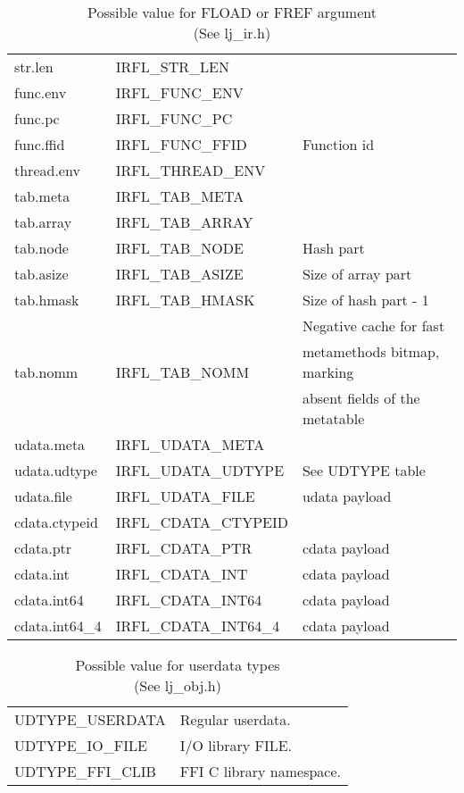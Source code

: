 \begin{table}
\centering
\begin{tabular}{|l|l|l|}
\hline
str.len        & IRFL\_STR\_LEN        & \\
func.env       & IRFL\_FUNC\_ENV       & \\
func.pc        & IRFL\_FUNC\_PC        & \\
func.ffid      & IRFL\_FUNC\_FFID      & Function id\\
thread.env     & IRFL\_THREAD\_ENV     & \\
tab.meta       & IRFL\_TAB\_META       & \\
tab.array      & IRFL\_TAB\_ARRAY      & \\
tab.node       & IRFL\_TAB\_NODE       & Hash part\\
tab.asize      & IRFL\_TAB\_ASIZE      & Size of array part\\
tab.hmask      & IRFL\_TAB\_HMASK      & Size of hash part - 1\\
\multirow{3}{*}{tab.nomm} & \multirow{3}{*}{IRFL\_TAB\_NOMM} & Negative cache for fast \\
& & metamethods bitmap, marking\\
& & absent fields of the metatable\\
udata.meta     & IRFL\_UDATA\_META     & \\
udata.udtype   & IRFL\_UDATA\_UDTYPE   & See UDTYPE table\\
udata.file     & IRFL\_UDATA\_FILE     & udata payload \\
cdata.ctypeid  & IRFL\_CDATA\_CTYPEID  & \\
cdata.ptr      & IRFL\_CDATA\_PTR      & cdata payload \\
cdata.int      & IRFL\_CDATA\_INT      & cdata payload \\
cdata.int64    & IRFL\_CDATA\_INT64    & cdata payload \\
cdata.int64\_4 & IRFL\_CDATA\_INT64\_4 & cdata payload \\
\hline
\end{tabular}
\caption{
  Possible value for FLOAD or FREF argument \\(See lj\_ir.h)
}
\label{tab:dump-fload-fref}
\end{table}
\begin{table}
\centering
\begin{tabular}{|l|l|}
\hline
UDTYPE\_USERDATA  & Regular userdata.\\
UDTYPE\_IO\_FILE  & I/O library FILE.\\
UDTYPE\_FFI\_CLIB & FFI C library namespace.\\\hline
\end{tabular}
\caption{
  Possible value for userdata types \\(See lj\_obj.h)
}
\label{tab:dump-fload-fref}
\end{table}
